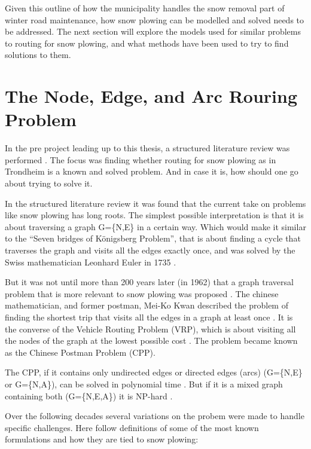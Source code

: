 
Given this outline of how the municipality handles the snow removal part of winter road maintenance, how snow plowing can be modelled and solved needs to be addressed. The next section will explore the models used for similar problems to routing for snow plowing, and what methods have been used to try to find solutions to them.


\section{The Node, Edge, and Arc Rouring Problem}
\label{the_nearp}

In the pre project leading up to this thesis, a structured literature review was performed \citep{forprosjektet}. The focus was finding whether routing for snow plowing as in Trondheim is a known and solved problem. And in case it is, how should one go about trying to solve it.

In the structured literature review it was found that the current take on problems like snow plowing has long roots. The simplest possible interpretation is that it is about traversing a graph G=\{N,E\} in a certain way. Which would make it similar to the “Seven bridges of Königsberg Problem”, that is about finding a cycle that traverses the graph and visits all the edges exactly once, and was solved by the Swiss mathematician Leonhard Euler in 1735 \citep{eulerBridges}.

But it was not until more than 200 years later (in 1962) that a graph traversal problem that is more relevant to snow plowing was proposed \citep{wohlk2008decade}. The chinese mathematician, and former postman, Mei-Ko Kwan described the problem of finding the shortest trip that visits all the edges in a graph at least once \citep{meiKoKwanCPP}. It is the converse of the Vehicle Routing Problem (VRP), which is about visiting all the nodes of the graph at the lowest possible cost \citep{laporte1992vehicle}. The problem became known as the Chinese Postman Problem (CPP).

The CPP, if it contains only undirected edges or directed edges (arcs) (G=\{N,E\} or G=\{N,A\}), can be solved in polynomial time \citep{wohlk2008decade}. But if it is a mixed graph containing both (G=\{N,E,A\}) it is NP-hard \citep{wohlk2008decade}.

Over the following decades several variations on the probem were made to handle specific challenges. Here follow definitions of some of the most known formulations and how they are tied to snow plowing:


